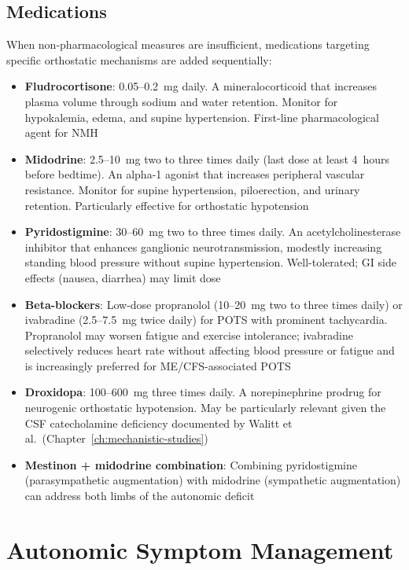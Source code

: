 \subsection{Medications}

When non-pharmacological measures are insufficient, medications targeting specific orthostatic mechanisms are added sequentially:

\begin{itemize}
    \item \textbf{Fludrocortisone}: 0.05--0.2~mg daily. A mineralocorticoid that increases plasma volume through sodium and water retention. Monitor for hypokalemia, edema, and supine hypertension. First-line pharmacological agent for NMH
    \item \textbf{Midodrine}: 2.5--10~mg two to three times daily (last dose at least 4~hours before bedtime). An alpha-1 agonist that increases peripheral vascular resistance. Monitor for supine hypertension, piloerection, and urinary retention. Particularly effective for orthostatic hypotension
    \item \textbf{Pyridostigmine}: 30--60~mg two to three times daily. An acetylcholinesterase inhibitor that enhances ganglionic neurotransmission, modestly increasing standing blood pressure without supine hypertension. Well-tolerated; GI side effects (nausea, diarrhea) may limit dose
    \item \textbf{Beta-blockers}: Low-dose propranolol (10--20~mg two to three times daily) or ivabradine (2.5--7.5~mg twice daily) for POTS with prominent tachycardia. Propranolol may worsen fatigue and exercise intolerance; ivabradine selectively reduces heart rate without affecting blood pressure or fatigue and is increasingly preferred for ME/CFS-associated POTS
    \item \textbf{Droxidopa}: 100--600~mg three times daily. A norepinephrine prodrug for neurogenic orthostatic hypotension. May be particularly relevant given the CSF catecholamine deficiency documented by Walitt et al.\ (Chapter~\ref{ch:mechanistic-studies})
    \item \textbf{Mestinon + midodrine combination}: Combining pyridostigmine (parasympathetic augmentation) with midodrine (sympathetic augmentation) can address both limbs of the autonomic deficit
\end{itemize}

\section{Autonomic Symptom Management}
\label{sec:autonomic-management}

